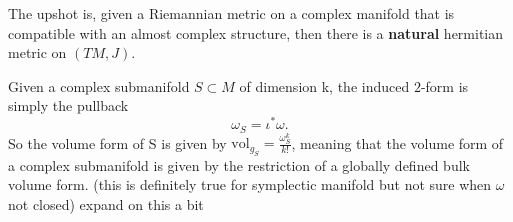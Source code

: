 The upshot is, given a Riemannian metric on a complex manifold that is compatible with an almost complex structure, then there is a \textbf{natural} hermitian metric on $(TM, J)$. 


Given a complex submanifold $S \subset M$ of dimension k, the induced $2$-form is simply the pullback
\begin{equation}
    \omega_S = \iota^* \omega.
\end{equation}
So the volume form of S is given by $\mathrm{vol}_{g_S} = \frac{\omega_S^k}{k!}$, meaning that the volume form of a complex submanifold is given by the restriction of a globally defined bulk volume form. (this is definitely true for symplectic manifold but not sure when $\omega$ not closed)
expand on this a bit
